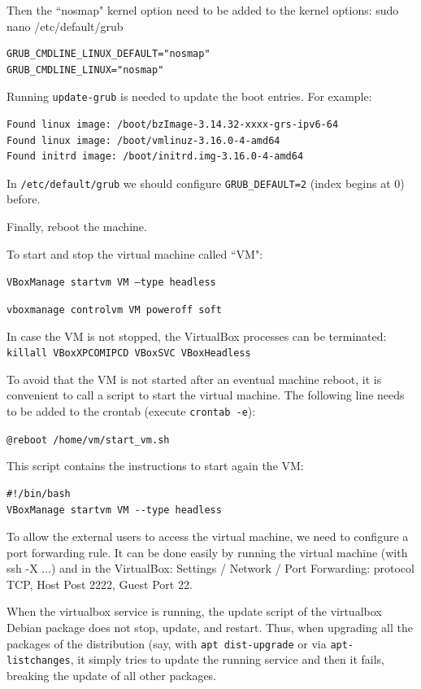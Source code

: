 \documentclass[a4paper,12pt]{article}
\begin{document}
Then the ``nosmap" kernel option need to be added to the kernel options: sudo nano /etc/default/grub

\begin{verbatim}
GRUB_CMDLINE_LINUX_DEFAULT="nosmap"
GRUB_CMDLINE_LINUX="nosmap"
\end{verbatim}

Running {\tt update-grub} is needed to update the boot entries. For example:

\begin{verbatim}
Found linux image: /boot/bzImage-3.14.32-xxxx-grs-ipv6-64
Found linux image: /boot/vmlinuz-3.16.0-4-amd64
Found initrd image: /boot/initrd.img-3.16.0-4-amd64
\end{verbatim}

In {\tt /etc/default/grub} we should configure {\tt GRUB\_DEFAULT=2} (index begins at 0) before.

Finally, reboot the machine.

To start and stop the virtual machine called ``VM":

{\tt VBoxManage startvm VM --type headless}

{\tt vboxmanage controlvm VM poweroff soft}

In case the VM is not stopped, the VirtualBox processes can be terminated: {\tt killall VBoxXPCOMIPCD VBoxSVC VBoxHeadless}

To avoid that the VM is not started after an eventual machine reboot, it is convenient to call a script to start the virtual machine. The following line needs to be added to the crontab (execute {\tt crontab -e}):

{\tt @reboot /home/vm/start\_vm.sh}

This script contains the instructions to start again the VM:

\begin{verbatim}
#!/bin/bash
VBoxManage startvm VM --type headless
\end{verbatim}

To allow the external users to access the virtual machine, we need to configure a port forwarding rule.
It can be done easily by running the virtual machine (with ssh -X ...) and in the VirtualBox: Settings / Network / Port Forwarding: protocol TCP, Host Post 2222, Guest Port 22.

\vspace{0.25cm}
When the virtualbox service is running, the update script of the virtualbox Debian package does not stop, update, and restart. Thus, when upgrading all the packages of the distribution (say, with {\tt apt dist-upgrade} or via {\tt apt-listchanges}, it simply tries to update the running service and then it fails, breaking the update of all other packages.
\end{document}
